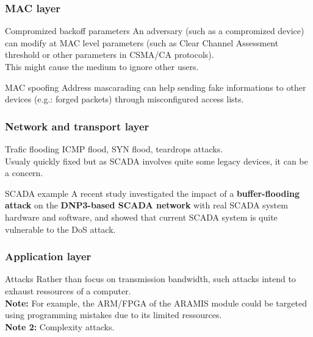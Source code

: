 \documentclass{beamer}
\begin{document}
\begin{frame}
    \frametitle{MAC layer}

    \begin{block}{Compromized backoff parameters}
        An adversary (such as a compromized device) can modify at MAC level parameters (such as Clear Channel Assessment threshold or other parameters in CSMA/CA protocols).\\
        \medskip
        This might cause the medium to ignore other users.
    \end{block}
    \vfill
    \begin{block}{MAC spoofing}
        Address mascarading can help sending fake informations to other devices (e.g.: forged packets) through misconfigured access lists.
    \end{block}
\end{frame}

\begin{frame}
    \frametitle{Network and transport layer}

    \begin{block}{Trafic flooding}
        ICMP flood, SYN flood, teardrops attacks.\\
        \medskip
        Usualy quickly fixed but as SCADA involves quite some legacy devices, it can be a concern.
    \end{block}
    \vfill
    \begin{block}{SCADA example}
        A recent study investigated the impact of a {\bf buffer-flooding attack} on the {\bf DNP3-based SCADA network} with real SCADA system hardware and software, and showed that current SCADA system is quite vulnerable to the DoS attack.
    \end{block}
\end{frame}

\begin{frame}
    \frametitle{Application layer}

    \begin{block}{Attacks}
        Rather than focus on transmission bandwidth, such attacks intend to exhaust ressources of a computer.\\
        \medskip
        {\bf Note:} For example, the ARM/FPGA of the ARAMIS module could be targeted using programming mistakes due to its limited ressources.\\
        \medskip
        {\bf Note 2:} Complexity attacks.
    \end{block}
\end{frame}
\end{document}
